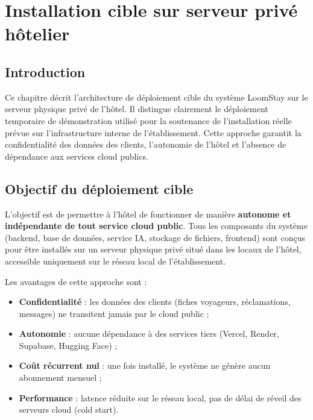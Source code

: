 
\chapter{Installation cible sur serveur privé hôtelier}
\label{chap:installation}

\section*{Introduction}

Ce chapitre décrit l'architecture de déploiement cible du système LoomStay sur le serveur physique privé de l'hôtel. Il distingue clairement le déploiement temporaire de démonstration utilisé pour la soutenance de l'installation réelle prévue sur l'infrastructure interne de l'établissement. Cette approche garantit la confidentialité des données des clients, l'autonomie de l'hôtel et l'absence de dépendance aux services cloud publics.

\section{Objectif du déploiement cible}
\label{sec:objectif_deploiement}

L'objectif est de permettre à l'hôtel de fonctionner de manière \textbf{autonome et indépendante de tout service cloud public}. Tous les composants du système (backend, base de données, service IA, stockage de fichiers, frontend) sont conçus pour être installés sur un serveur physique privé situé dans les locaux de l'hôtel, accessible uniquement sur le réseau local de l'établissement.

Les avantages de cette approche sont :
\begin{itemize}
  \item \textbf{Confidentialité} : les données des clients (fiches voyageurs, réclamations, messages) ne transitent jamais par le cloud public ;
  \item \textbf{Autonomie} : aucune dépendance à des services tiers (Vercel, Render, Supabase, Hugging Face) ;
  \item \textbf{Coût récurrent nul} : une fois installé, le système ne génère aucun abonnement mensuel ;
  \item \textbf{Performance} : latence réduite sur le réseau local, pas de délai de réveil des serveurs cloud (cold start).
\end{itemize}

